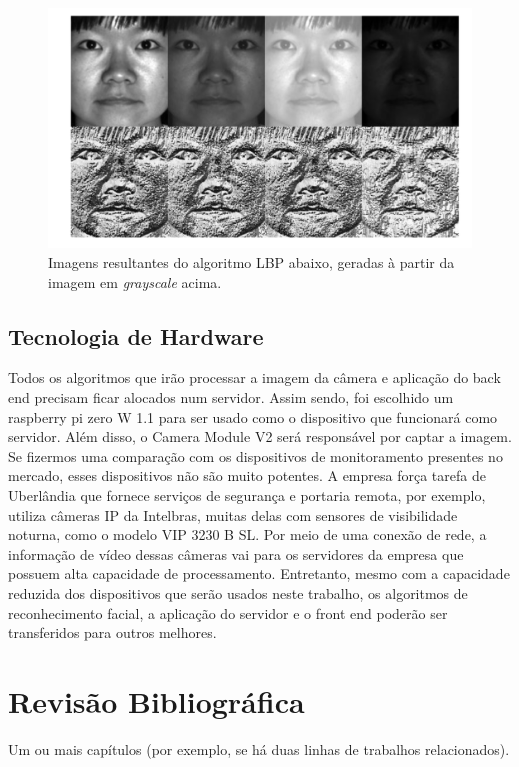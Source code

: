 \documentclass[12pt, %
openright, 
oneside, %
a4paper,    %
brazil]{facom-ufu-abntex2}
\begin{document}
\begin{figure}[!ht]
	\centering
	\includegraphics[width=0.7\linewidth]{grayscale.PNG}
	\caption[De \emph{grayscale} para LBP
	]{Imagens resultantes do algoritmo LBP abaixo, geradas à partir da imagem em \emph{grayscale} acima.}
	\label{fig:graficosVariandoTamanhoRede}
\end{figure}

\section{Tecnologia de Hardware}

Todos os algoritmos que irão processar a imagem da câmera e aplicação do back
end precisam ficar alocados num servidor. Assim sendo, foi escolhido um
raspberry pi zero W 1.1 para ser usado como o dispositivo que funcionará como
servidor. Além disso, o Camera Module V2 será responsável por captar a imagem.
Se fizermos uma comparação com os dispositivos de monitoramento presentes no
mercado, esses dispositivos não são muito potentes. A empresa força tarefa de
Uberlândia que fornece serviços de segurança e portaria remota, por exemplo,
utiliza câmeras IP da Intelbras, muitas delas com sensores de visibilidade
noturna, como o modelo VIP 3230 B SL. Por meio de uma conexão de rede, a
informação de vídeo dessas câmeras vai para os servidores da empresa que
possuem alta capacidade de processamento. Entretanto, mesmo com a capacidade
reduzida dos dispositivos que serão usados neste trabalho, os algoritmos de
reconhecimento facial, a aplicação do servidor e o front end poderão ser
transferidos para outros melhores.


\chapter{Revisão Bibliográfica}
Um ou mais capítulos (por exemplo, se há duas linhas de trabalhos
relacionados).
\end{document}
